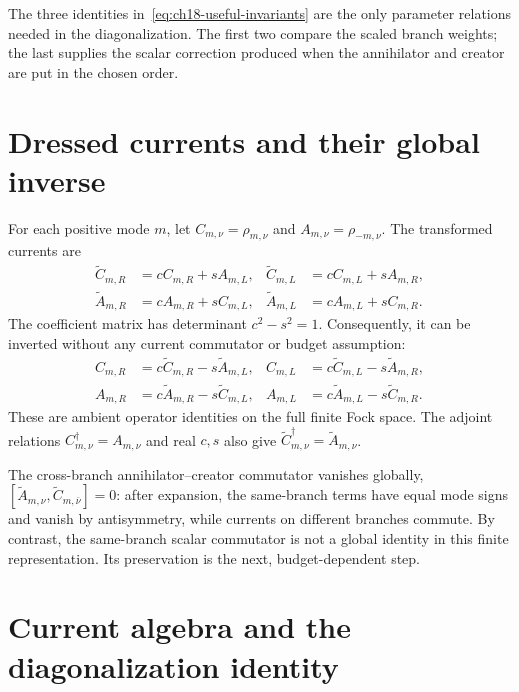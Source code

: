 The three identities in~\eqref{eq:ch18-useful-invariants} are the only parameter relations needed in the diagonalization. The first two compare the scaled branch weights; the last supplies the scalar correction produced when the annihilator and creator are put in the chosen order.

\section{Dressed currents and their global inverse}

For each positive mode $m$, let $C_{m,\nu}=\rho_{m,\nu}$ and $A_{m,\nu}=\rho_{-m,\nu}$. The transformed currents are
\begin{align}
  \widetilde C_{m,R}&=cC_{m,R}+sA_{m,L}, &
  \widetilde C_{m,L}&=cC_{m,L}+sA_{m,R},\label{eq:ch18-dressed-creators}\\
  \widetilde A_{m,R}&=cA_{m,R}+sC_{m,L}, &
  \widetilde A_{m,L}&=cA_{m,L}+sC_{m,R}.
  \label{eq:ch18-dressed-annihilators}
\end{align}
The coefficient matrix has determinant $c^2-s^2=1$. Consequently, it can be inverted without any current commutator or budget assumption:
\begin{align}
  C_{m,R}&=c\widetilde C_{m,R}-s\widetilde A_{m,L}, &
  C_{m,L}&=c\widetilde C_{m,L}-s\widetilde A_{m,R},\label{eq:ch18-inverse-creators}\\
  A_{m,R}&=c\widetilde A_{m,R}-s\widetilde C_{m,L}, &
  A_{m,L}&=c\widetilde A_{m,L}-s\widetilde C_{m,R}.
  \label{eq:ch18-inverse-annihilators}
\end{align}
\label{thm:global_inversion}
These are ambient operator identities on the full finite Fock space. The adjoint relations $C_{m,\nu}^\dagger=A_{m,\nu}$ and real $c,s$ also give $\widetilde C_{m,\nu}^\dagger=\widetilde A_{m,\nu}$.

The cross-branch annihilator--creator commutator vanishes globally, $[\widetilde A_{m,\nu},\widetilde C_{m,\bar\nu}]=0$: after expansion, the same-branch terms have equal mode signs and vanish by antisymmetry, while currents on different branches commute. By contrast, the same-branch scalar commutator is not a global identity in this finite representation. Its preservation is the next, budget-dependent step.

\section{Current algebra and the diagonalization identity}

